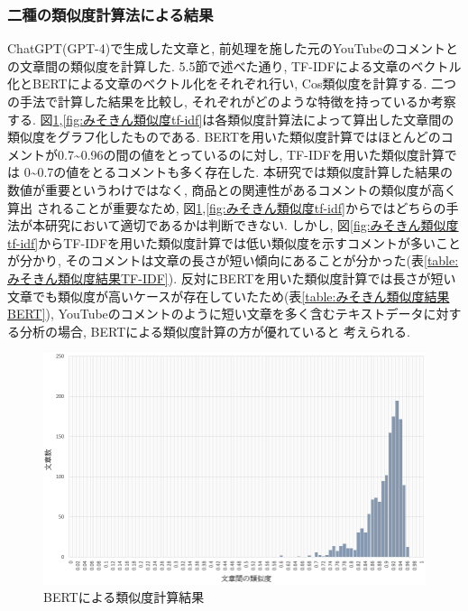 \documentclass{ltjarticle}
\begin{document}
\subsubsection{二種の類似度計算法による結果}
ChatGPT(GPT-4)で生成した文章と, 前処理を施した元のYouTubeのコメントとの文章間の類似度を計算した. 
5.5節で述べた通り, TF-IDFによる文章のベクトル化とBERTによる文章のベクトル化をそれぞれ行い, Cos類似度を計算する. 
二つの手法で計算した結果を比較し, それぞれがどのような特徴を持っているか考察する. 
図\ref{fig:みそきん類似度BERT},\ref{fig:みそきん類似度tf-idf}は各類似度計算法によって算出した文章間の類似度をグラフ化したものである. 
BERTを用いた類似度計算ではほとんどのコメントが0.7\sim0.96の間の値をとっているのに対し, TF-IDFを用いた類似度計算では
0\sim0.7の値をとるコメントも多く存在した. 
本研究では類似度計算した結果の数値が重要というわけではなく, 商品との関連性があるコメントの類似度が高く算出
されることが重要なため, 図\ref{fig:みそきん類似度BERT},\ref{fig:みそきん類似度tf-idf}からではどちらの手法が本研究において適切であるかは判断できない. 
しかし, 図\ref{fig:みそきん類似度tf-idf}からTF-IDFを用いた類似度計算では低い類似度を示すコメントが多いことが分かり, 
そのコメントは文章の長さが短い傾向にあることが分かった(表\ref{table:みそきん類似度結果TF-IDF}). 
反対にBERTを用いた類似度計算では長さが短い文章でも類似度が高いケースが存在していたため(表\ref{table:みそきん類似度結果BERT}), 
YouTubeのコメントのように短い文章を多く含むテキストデータに対する分析の場合, BERTによる類似度計算の方が優れていると
考えられる. 
\newpage
\begin{figure}[h]
    \centering
    \includegraphics[width = 13.8cm]{images/みそきん類似度BERT.png}
    \caption{BERTによる類似度計算結果}
    \label{fig:みそきん類似度BERT}
\end{figure}
\vspace{10truept}
\end{document}
